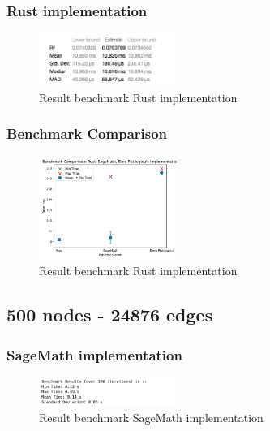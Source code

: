 \subsubsection*{Rust implementation}
\begin{figure}[!h]
    \centering
    \includegraphics[width=0.40\textwidth]{images/benchmark/graph_200_3880/benchmark_graph_200_3880_rust}
    \caption{Result benchmark Rust implementation}
    \label{fig:benchmark-graph-200-3880-rust}
\end{figure}

\subsubsection*{Benchmark Comparison}
\begin{figure}[!h]
    \centering
    \includegraphics[width=0.40\textwidth]{images/benchmark/graph_200_3880/benchmark_comparison_graph_200_3880}
    \caption{Result benchmark Rust implementation}
    \label{fig:benchmark-comparison-graph-200-3880}
\end{figure}


\newpage

\subsection{500 nodes - 24876 edges}\label{subsec:result-for-graphs-500-24876}

\subsubsection*{SageMath implementation}
\begin{figure}[!h]
    \centering
    \includegraphics[width=0.40\textwidth]{images/benchmark/too_large_graph/benchmark_too_large_graph_sagemath}
    \caption{Result benchmark SageMath implementation}
    \label{fig:benchmark-graph-500-24876-sagemath}
\end{figure}

